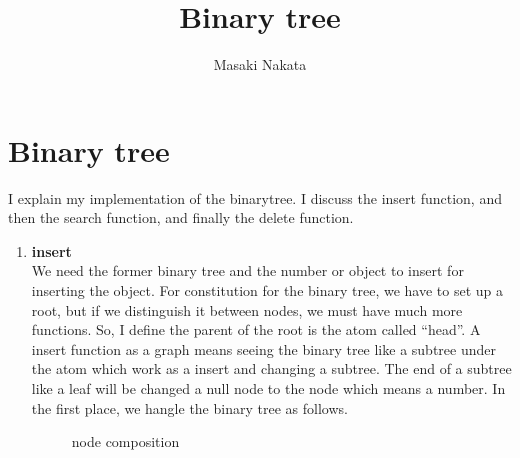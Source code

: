 \documentclass[dvipdfmx]{article}
\title{Binary tree}
\author{Masaki Nakata}
\begin{document}
\maketitle

\section{Binary tree}
I explain my implementation of the binarytree. I discuss the insert function, and then the search function, and finally the delete function. 
\begin{enumerate}
\item {\bf insert}\\
  We need the former binary tree and the number or object to insert for inserting the object. For constitution for the binary tree, we have to set up a root, but if we distinguish it between nodes, we must have much more functions. So, I define the parent of the root is the atom called ``head''. A insert function as a graph means seeing the binary tree like a subtree under the atom which work as a insert and changing a subtree. The end of a subtree like a leaf will be changed a null node to the node which means a number. In the first place, we hangle the binary tree as follows.
  \begin{figure}[ht]
    \begin{center}
    \end{center}
    \caption{node composition}
  \end{figure}
  

\end{enumerate}
\end{document}
